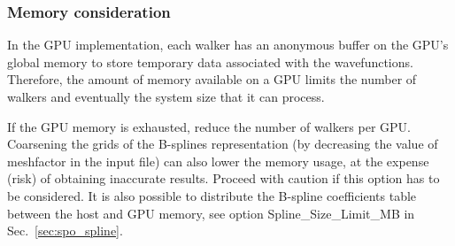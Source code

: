 
\subsubsection{Memory consideration}

In the GPU implementation, each walker has an anonymous buffer on the GPU's global memory to store temporary data associated with the wavefunctions. Therefore, the amount of memory available on a GPU limits the number of walkers and eventually the system size that it can process.

If the GPU memory is exhausted, reduce the number of walkers per GPU.
Coarsening the grids of the B-splines representation (by decreasing the value of meshfactor in the input file) can also lower the memory usage,
at the expense (risk) of obtaining inaccurate results. Proceed with caution if this option has to be considered.
It is also possible to distribute the B-spline coefficients table between the host and GPU memory, see option Spline\_Size\_Limit\_MB in Sec.~\ref{sec:spo_spline}.
